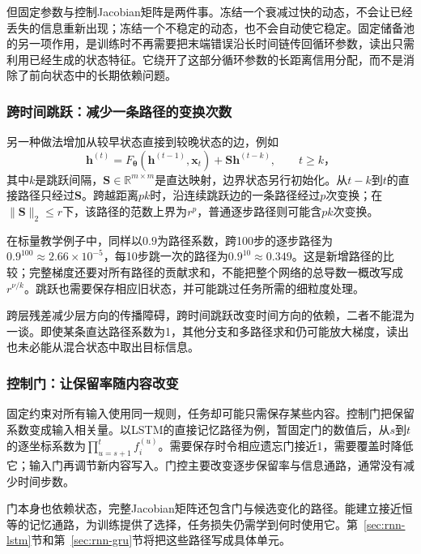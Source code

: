 但固定参数与控制Jacobian矩阵是两件事。冻结一个衰减过快的动态，不会让已经丢失的信息重新出现；冻结一个不稳定的动态，也不会自动使它稳定。固定储备池的另一项作用，是训练时不再需要把末端错误沿长时间链传回循环参数，读出只需利用已经生成的状态特征。它绕开了这部分循环参数的长距离信用分配，而不是消除了前向状态中的长期依赖问题。

\subsubsection{跨时间跳跃：减少一条路径的变换次数}
\label{sec:rnn-temporal-skips}

另一种做法增加从较早状态直接到较晚状态的边，例如
\begin{equation}
  \bm h^{(t)}=F_{\bm\theta}(\bm h^{(t-1)},\bm x_t)
       +\bm S\bm h^{(t-k)},\qquad t\geq k\text{，}
  \label{eq:rnn-temporal-skip}
\end{equation}
其中$k$是跳跃间隔，$\bm S\in\mathbb R^{m\times m}$是直达映射，边界状态另行初始化。从$t-k$到$t$的直接路径只经过$\bm S$。跨越距离$pk$时，沿连续跳跃边的一条路径经过$p$次变换；在$\lVert\bm S\rVert_2\leq r$下，该路径的范数上界为$r^p$，普通逐步路径则可能含$pk$次变换。

在标量教学例子中，同样以$0.9$为路径系数，跨100步的逐步路径为$0.9^{100}\approx2.66\times10^{-5}$，每10步跳一次的路径为$0.9^{10}\approx0.349$。这是新增路径的比较；完整梯度还要对所有路径的贡献求和，不能把整个网络的总导数一概改写成$r^{\nu/k}$。跳跃也需要保存相应旧状态，并可能跳过任务所需的细粒度处理。

跨层残差减少层方向的传播障碍，跨时间跳跃改变时间方向的依赖，二者不能混为一谈。即使某条直达路径系数为1，其他分支和多路径求和仍可能放大梯度，读出也未必能从混合状态中取出目标信息。

\subsubsection{控制门：让保留率随内容改变}
\label{sec:rnn-gated-memory-path}

固定约束对所有输入使用同一规则，任务却可能只需保存某些内容。控制门把保留系数变成输入相关量。以LSTM的直接记忆路径为例，暂固定门的数值后，从$s$到$t$的逐坐标系数为$\prod_{u=s+1}^{t}f_i^{(u)}$。需要保存时令相应遗忘门接近1，需要覆盖时降低它；输入门再调节新内容写入。门控主要改变逐步保留率与信息通路，通常没有减少时间步数。

门本身也依赖状态，完整Jacobian矩阵还包含门与候选变化的路径。能建立接近恒等的记忆通路，为训练提供了选择，任务损失仍需学到何时使用它。第~\ref{sec:rnn-lstm}节和第~\ref{sec:rnn-gru}节将把这些路径写成具体单元。

